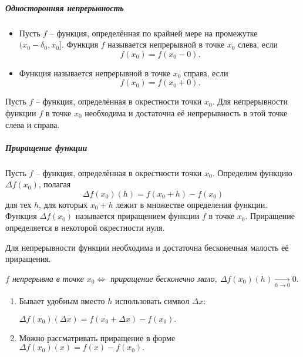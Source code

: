 \subparagraph{Односторонняя непрерывность}
\begin{Definition}
\begin{itemize}
  \item Пусть $f$ -- функция, определённая по крайней мере на промежутке $(x_0 - \delta_0, x_0]$.
  Функция $f$ называется непрерывной в точке $x_0$ слева, если
  $$f(x_0) = f(x_0 - 0).$$
  \item Функция называется непрерывной в точке $x_0$ справа, если
  $$f(x_0) = f(x_0 + 0).$$
\end{itemize}
\end{Definition}
\begin{Proposition}
Пусть $f$ -- функция, определённая в окрестности точки $x_0$. Для непрерывности функции $f$ в точке $x_0$ необходима и достаточна её непрерывность в этой точке слева и справа.
\end{Proposition}
\subparagraph{Приращение функции}
\begin{Definition}
  Пусть $f$ -- функция, определённая в окрестности точки $x_0$. Определим функцию $\Delta f(x_0)$, полагая
    $$\Delta f(x_0)(h) = f(x_0 + h) - f(x_0)$$
  для тех $h$, для которых $x_0 + h$ лежит в множестве определения функции.
  Функция $\Delta f(x_0)$ называется приращением функции $f$ в точке $x_0$. Приращение определяется в некоторой окрестности нуля.
\end{Definition}
\begin{Theorem}
  Для непрерывности функции необходима и достаточна бесконечная малость её приращения.
\end{Theorem}
\centerline \it{$f$ непрерывна в точке $x_0 \Leftrightarrow$ приращение бесконечно мало, $\Delta f (x_0)(h) \xrightarrow[h \rightarrow 0]{} 0.$}
\begin{enumerate}
  \item Бывает удобным вместо $h$ использовать символ $\Delta x$:

  \noindent $\Delta f(x_0)(\Delta x) = f(x_0 + \Delta x) - f(x_0).$
  \item Можно рассматривать приращение в форме $\Delta f(x_0)(x) = f(x) - f(x_0).$
\end{enumerate}
